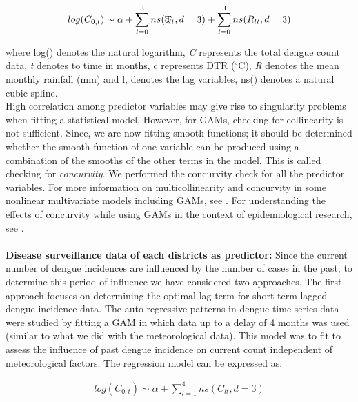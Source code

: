 \documentclass{bmcart}
\begin{document}
\begin{equation}
\begin{aligned}
\label{eq:meteorological}
log (C_{0,t}) \sim \alpha +  \sum_{l=0}^{3} ns(\rlap{T}c _ {lt}, d =3) + \sum_{l=0}^{3} ns(R_ {lt}, d =3)
\end{aligned}
\end{equation}


where log() denotes the natural logarithm, \textit{C} represents the total dengue count data, \textit{t} denotes to time in months, c represents DTR ($^{\circ}$C), \textit{R} denotes the mean monthly rainfall (mm) and  l, denotes the lag variables, ns() denotes a natural cubic spline. \\

High correlation among predictor variables may give rise to singularity problems when fitting a statistical model. However, for GAMs, checking for collinearity is not sufficient. Since, we are now fitting smooth functions; it should be determined whether the smooth function of one variable can be produced using a combination of the smooths of the other terms in the model. This is called checking for \textit{concurvity}. We performed the concurvity check for all the predictor variables. For more information on multicollinearity and concurvity in some nonlinear multivariate models including GAMs, see \cite{morlini2006multicollinearity}. For understanding the effects of concurvity while using GAMs in the context of epidemiological research, see \cite{ramsay2003effect, neuberger2004acute}. \\ \\
\textbf{Disease surveillance data of each districts as predictor:} Since the current number of dengue incidences are influenced by the number of cases in the past, to determine this period of influence we have considered two approaches. The first approach focuses on determining the optimal lag term for short-term lagged dengue incidence data. The auto-regressive patterns in dengue time series data were studied by fitting a GAM in which data up to a delay of 4 months was used (similar to what we did with the meteorological data). This model was to fit to assess the influence of past dengue incidence on current count independent of meteorological factors. The regression model can be expressed as:

\begin{equation}
\begin{aligned}
\label{eq:short}
log (C_{0,t}) \sim \alpha + \sum_{l=1}^{4} ns(C_ {lt}, d =3) 
\end{aligned}
\end{equation}
\end{document}
